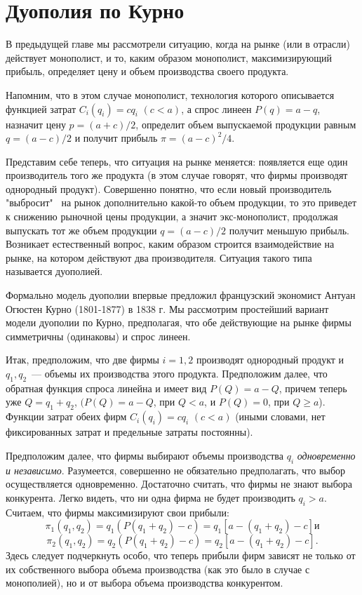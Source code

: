 \section{Дуополия по Курно}

В предыдущей главе мы рассмотрели ситуацию, когда на рынке (или в
отрасли) действует монополист, и то, каким образом монополист,
максимизирующий прибыль, определяет цену и объем
производства своего продукта.

Напомним, что в этом случае монополист, технология которого
описывается функцией затрат $C_i(q_i)=cq_i$ $(c<a)$, а спрос линеен
$P(q)=a-q$, назначит цену $p=(a+c)/2$, определит объем выпускаемой
продукции равным $q=(a-c)/2$ и получит прибыль $\pi = (a-c)^2/4$.

Представим себе теперь, что ситуация на рынке меняется: появляется
еще один производитель того же продукта (в этом случае говорят, что
фирмы производят однородный продукт). Совершенно понятно, что если
новый производитель "выбросит" \, на рынок дополнительно какой-то объем
продукции, то это приведет к снижению рыночной цены продукции, а
значит экс-монополист, продолжая выпускать тот же объем продукции
$q=(a-c)/2$ получит меньшую прибыль. Возникает естественный вопрос,
каким образом строится взаимодействие на рынке, на котором действуют
два производителя. Ситуация такого типа называется дуополией.

Формально модель дуополии впервые предложил французский экономист
Антуан Огюстен Курно (1801-1877) в 1838 г. Мы рассмотрим простейший
вариант модели дуополии по Курно, предполагая, что обе действующие
на рынке фирмы симметричны (одинаковы) и спрос линеен.

Итак, предположим, что две фирмы $i=1,2$ производят однородный
продукт и $q_1,q_2$~---  объемы их производства этого продукта.
Предположим далее, что обратная функция спроса линейна и имеет вид
$P(Q)=a-Q$, причем теперь уже $Q=q_1+q_2$,
$(P(Q)=a-Q$, при $Q<a$, и $P(Q)=0$, при $Q\ge a$). Функции затрат
обеих фирм $C_i(q_i)=cq_i$ $(c<a)$ (иными словами, нет фиксированных
затрат и предельные затраты постоянны).

Предположим далее, что фирмы выбирают объемы производства $q_i$ {\it
одновременно и независимо}. Разумеется, совершенно не обязательно
предполагать, что выбор осуществляется одновременно. Достаточно
считать, что фирмы не знают выбора конкурента. Легко видеть, что
ни одна фирма не будет производить $q_i>a$. Считаем, что фирмы
максимизируют свои прибыли:
$$
\pi_1(q_1,q_2)=q_1(P(q_1+q_2)-c)=q_1[a-(q_1+q_2)-c] и
$$
$$
\pi_2(q_1,q_2)=q_2(P(q_1+q_2)-c)=q_2[a-(q_1+q_2)-c].
$$
Здесь следует подчеркнуть особо, что теперь прибыли фирм зависят не
только от их собственного выбора объема производства (как это было в
случае с монополией), но и от выбора объема производства
конкурентом.

